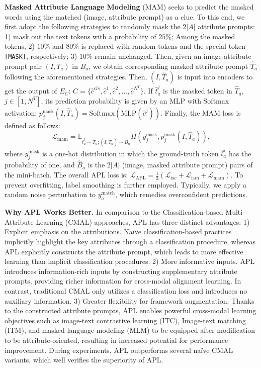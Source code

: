 \documentclass[sigconf]{acmart}
\begin{document}
\noindent\textbf{Masked Attribute Language Modeling}
(MAM) seeks to predict the masked words using the matched (image, attribute prompt) as a clue.
To this end, we first adopt the following strategies to randomly mask the $2|A|$ attribute prompts:
1) mask out the text tokens with a probability of $25\%$; 
Among the masked tokens, 2) $10\%$ and $80\%$ is replaced with random tokens and the special token \texttt{[MASK]}, respectively; 
3) $10\%$ remain unchanged.
Then, given an image-attribute prompt pair $(I, T_a)$ in $B_a$, we obtain corresponding masked attribute prompt $\hat{T}_a$ following the aforementioned strategies.
Then, $(I, \hat{T}_a)$ is input into encoders to get the output of $E_C$: $\hat{C} = \{\hat{c}^{cls}, \hat{c}^1, \hat{c}^2, ..., \hat{c}^{N^T}\}$.
If $\hat{t}^j_a$ is the masked token in $\hat{T}_a$, $j \in [1, N^T]$, its prediction probability is given by an MLP with Softmax activation: $p^{\text{mask}}_j(I, \hat{T}_a) = \text{Softmax}(\text{MLP}(\hat{c}^{j}))$. Finally, the MAM loss is defined as follows:
\vspace{-.1in}
\begin{equation}
\label{malmLoss}
\mathcal{L}_{\text{mam}} = \mathbb{E}_{\hat{t}^j_a \sim \hat{T}_a;(I,\hat{T}_a) \sim \hat{B}_a}H(y^{\text{mask}}_j, p^{\text{mask}}_j(I, \hat{T}_a)), \end{equation}
where $y^{\text{mask}}_j$ is a one-hot distribution in which the ground-truth
token $\hat{t}^j_a$ has the probability of one, and $\hat{B}_a$ is the $2|A|$ (image, masked attribute prompt) pairs of the mini-batch.
The overall APL loss is: $\mathcal{L}_{\text{APL}} = \frac{1}{3}(\mathcal{L}_{\text{iac}} + \mathcal{L}_{\text{iam}} +\mathcal{L}_{\text{mam}}).$
To prevent overfitting, label smoothing is further employed. Typically, we apply a random noise perturbation to $y^{\text{match}}_{a}$, which remedies overconfident predictions.


\noindent\textbf{Why APL Works Better.} 
In comparison to the Classification-based Multi-Attribute Learning (CMAL) approaches, APL has three distinct advantages: 
1) Explicit emphasis on the attributions. Na\"ive classification-based practices implicitly highlight the key attributes through a classification procedure, whereas APL explicitly constructs the attribute prompt, which leads to more effective learning than implicit classification procedures.
2) More informative inputs. APL introduces information-rich inputs by constructing supplementary attribute prompts, providing richer information for cross-modal alignment learning. In contrast, traditional CMAL only utilizes a classification loss and introduces no auxiliary information.
3) Greater flexibility for framework augmentation. Thanks to the constructed attribute prompts, APL enables powerful cross-modal learning objectives such as image-text contrastive learning (ITC), Image-text matching (ITM), and masked language modeling (MLM) to be equipped after modification to be attribute-oriented, resulting in increased potential for performance improvement. During experiments, APL outperforms several na\"ive CMAL variants, which well verifies the superiority of APL.
\end{document}
